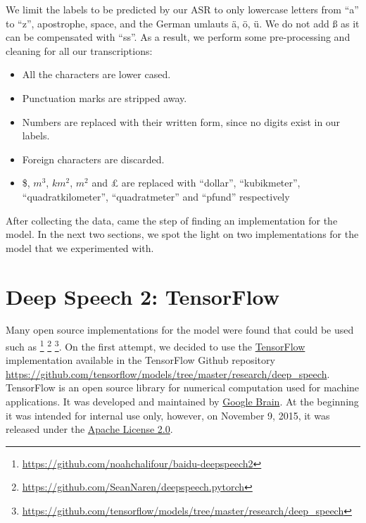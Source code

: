 We limit the labels to be predicted by our \ac{ASR} to only lowercase letters from \enquote{a} to \enquote{z}, apostrophe, space, and the German umlauts {\"a}, {\"o}, {\"u}. We do not add {\ss} as it can be compensated with \enquote{ss}. As a result, we perform some pre-processing and cleaning for all our transcriptions:
\begin{itemize}
	\item All the characters are lower cased.
	\item Punctuation marks are stripped away.
	\item Numbers are replaced with their written form, since no digits exist in our labels.
	\item Foreign characters are discarded.
	\item \$, $m^3$, $km^2$, $m^2$ and £ are replaced with \enquote{dollar}, \enquote{kubikmeter}, \enquote{quadratkilometer}, \enquote{quadratmeter} and \enquote{pfund} respectively
\end{itemize}

After collecting the data, came the step of finding an implementation for the model. In the next two sections, we spot the light on two implementations for the model that we experimented with.








































\section{Deep Speech 2: TensorFlow}
\label{meth:s3}

Many open source implementations for the model were found that could be used such as \footnote{\url{https://github.com/noahchalifour/baidu-deepspeech2}} \footnote{\url{https://github.com/SeanNaren/deepspeech.pytorch}} \footnote{\url{https://github.com/tensorflow/models/tree/master/research/deep_speech}}. On the first attempt, we decided to use the \href{https://www.tensorflow.org/}{TensorFlow} \cite{tensorflow2015-whitepaper} implementation available in the TensorFlow Github repository \url{https://github.com/tensorflow/models/tree/master/research/deep_speech}. TensorFlow is an open source library for numerical computation used for machine applications. It was developed and maintained by \href{https://ai.google/research/teams/brain}{Google Brain}. At the beginning it was intended for internal use only, however, on  November 9, 2015, it was released under the \href{http://www.apache.org/licenses/LICENSE-2.0}{Apache License 2.0}.

